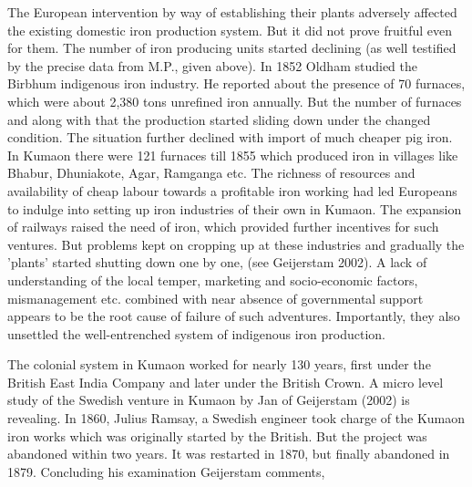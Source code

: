 The European intervention by way of establishing their plants adversely affected the existing domestic iron production system. But it did not prove fruitful even for them. The number of iron producing units started declining (as well testified by the precise data from M.P., given above). In 1852 Oldham studied the Birbhum indigenous iron industry. He reported about the presence of 70 furnaces, which were about 2,380 tons unrefined iron annually. But the number of furnaces and along with that the production started sliding down under the changed condition. The situation further declined with import of much cheaper pig iron. In Kumaon there were 121 furnaces till 1855 which produced iron in villages like Bhabur, Dhuniakote, Agar, Ramganga etc. The richness of resources and availability of cheap labour towards a profitable iron working had led Europeans to indulge into setting up iron industries of their own in Kumaon. The expansion of railways raised the need of iron, which provided further incentives for such ventures. But problems kept on cropping up at these industries and gradually the 'plants' started shutting down one by one, (see Geijerstam 2002). A lack of understanding of the local temper, marketing and socio-economic factors, mismanagement etc. combined with near absence of governmental support appears to be the root cause of failure of such adventures. Importantly, they also unsettled the well-entrenched system of indigenous iron production.

The colonial system in Kumaon worked for nearly 130 years, first under the British East India Company and later under the British Crown. A micro level study of the Swedish venture in Kumaon by Jan of Geijerstam (2002) is revealing. In 1860, Julius Ramsay, a Swedish engineer took charge of the Kumaon iron works which was originally started by the British. But the project was abandoned within two years. It was restarted in 1870, but finally abandoned in 1879. Concluding his examination Geijerstam comments,


